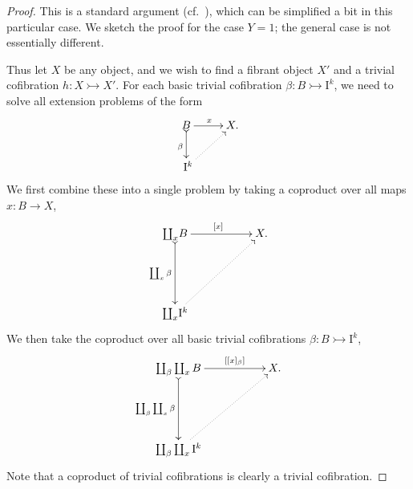 \documentclass[11pt]{article}
\newcommand{\mono}{\ensuremath{\rightarrowtail}}
\newcommand{\ra}{\ensuremath{\rightarrow}}
\newcommand{\I}{\ensuremath{\mathrm{I}}}
\theoremstyle{remark}
\theoremstyle{definition}
\begin{document}
\begin{proof}
This is a standard argument (cf.~\cite{Quillen,Garner}), which can be simplified a bit in this particular case.  We sketch the proof for the case $Y=1$; the general case is not essentially different.

Thus let $X$ be any object, and we wish to find a fibrant object $X'$ and a trivial cofibration $h : X\mono X'$.
For each basic trivial cofibration $\beta : B\mono \I^{k}$, we need to solve all extension problems of the form
\begin{equation}\label{diagram:extensionforX}
\xymatrix{
B \ar@{>->}[d]_{\beta} \ar[r]^x & X.\\
\ \I^{k} \ar@{..>}[ru]&
}
\end{equation}
We first combine these into a single problem by taking a coproduct over all maps $x : B\ra X$,
\begin{equation*}%
\xymatrix{
{{\coprod_{x}} B} {\ar@{>->}[dd]_-{\coprod_{x}\beta}} {\ar[rr]^{[x]}} && X.\\
&&\\
{{\coprod_{x}} \I^{k}} {\ar@{..>}[rruu]} &&
}
\end{equation*}
%
We then take the coproduct over all basic trivial cofibrations $\beta : B\mono \I^k$,
\begin{equation*}%
\xymatrix{
{\coprod_{\beta}\coprod_{x} B} \ar@{>->}[dd]_-{\coprod_{\beta}\coprod_{x}\beta} {\ar[rr]^-{[[x]_\beta]}} && X.\\
&&\\
{\coprod_{\beta}\coprod_{x} \I^{k}} {\ar@{..>}[rruu]} &&
}
\end{equation*}
Note that a coproduct of trivial cofibrations is clearly a trivial cofibration. 


\end{proof}
\end{document}
